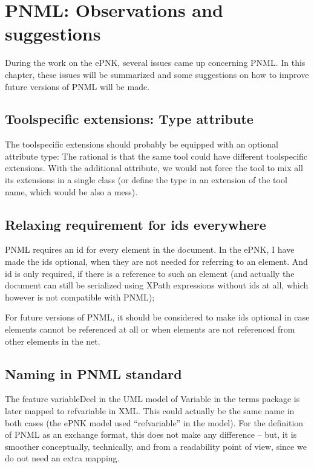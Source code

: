 
\chapter{PNML: Observations and suggestions}
\label{chap:pnml-suggestions}

During the work on the ePNK, several issues came up concerning PNML.
In this chapter, these issues will be summarized and some suggestions
on how to improve future versions of PNML will be made. 


\section{Toolspecific extensions: Type attribute}

The toolspecific extensions should probably be equipped with an
optional attribute type: The rational is that the same tool
could have different toolspecific extensions. With the additional
attribute, we would not force the tool to mix all its extensions
in a single class (or define the type in an extension of the
tool name, which would be also a mess).

\section{Relaxing requirement for ids everywhere}  
PNML requires an id for every element in the document. In the ePNK,
I have made the ids optional, when they are not needed for referring
to an element. And id is only required, if there is a reference to such an
element (and actually the document can still be serialized using XPath
expressions without ids at all, which however is not compatible with PNML);

For future versions of PNML, it should be considered to make ids optional in
case elements cannot be referenced at all or when elements are not referenced
from other elements in the net.
  
\section{Naming in PNML standard}
The feature variableDecl in the UML model of Variable in the
terms package is later mapped to refvariable in XML. This
could actually be the same name in both cases (the ePNK model used
``refvariable'' in the model). 
%
For the definition of PNML as an exchange format, this does not make any 
difference -- but, it is smoother conceptually, technically, and from a
readability point of view, since we do not need an extra mapping.

